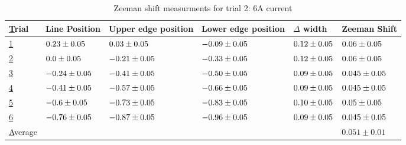 \begin{table}
    \begin{adjustwidth}{-100pt}{-100pt}
        \centering
        \begin{tabular}{|l|l|l|l|l|l|}
            \hline
            {\ul Trial}   & Line Position                & Upper edge position          & Lower edge position          & $\Delta$ width              & Zeeman Shift                 \\ \hline
            {\ul 1}       & $0.23 \pm 0.05$  & $0.03 \pm 0.05$  & $-0.09 \pm 0.05$ & $0.12 \pm 0.05$ & $0.06 \pm 0.05$  \\ \hline
            {\ul 2}       & $0.0 \pm 0.05$   & $-0.21 \pm 0.05$ & $-0.33 \pm 0.05$ & $0.12 \pm 0.05$ & $0.06 \pm 0.05$  \\ \hline
            {\ul 3}       & $-0.24 \pm 0.05$ & $-0.41 \pm 0.05$ & $-0.50 \pm 0.05$ & $0.09 \pm 0.05$ & $0.045 \pm 0.05$ \\ \hline
            {\ul 4}       & $-0.41 \pm 0.05$ & $-0.57 \pm 0.05$ & $-0.66 \pm 0.05$ & $0.09 \pm 0.05$ & $0.045 \pm 0.05$ \\ \hline
            {\ul 5}       & $-0.6 \pm 0.05$  & $-0.73 \pm 0.05$ & $-0.83 \pm 0.05$ & $0.10 \pm 0.05$ & $0.05 \pm 0.05$  \\ \hline
            {\ul 6}       & $-0.76 \pm 0.05$ & $-0.87 \pm 0.05$ & $-0.96 \pm 0.05$ & $0.09 \pm 0.05$ & $0.045 \pm 0.05$ \\ \hline
            {\ul Average} &                              &                              &                              &                             & $0.051 \pm 0.01$             \\ \hline
        \end{tabular}
    \end{adjustwidth}

    \caption{Zeeman shift measurments for trial 2: 6A current}


\end{table}


